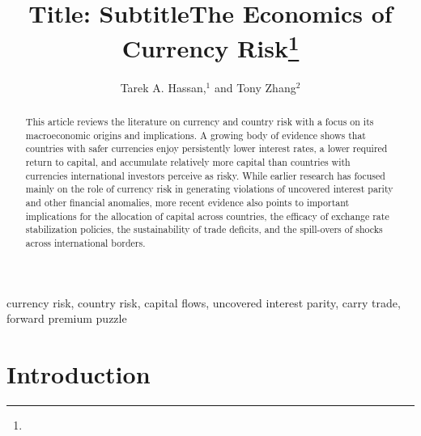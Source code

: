\documentclass{ar-1col}
\begin{document}

\title{Title: Subtitle}


\author{Tarek A. Hassan,$^1$ and Tony Zhang$^2$  }



\title{The Economics of Currency Risk\thanks{}}



\begin{abstract}
  This article reviews the literature on currency and country risk with a focus on its macroeconomic origins and implications. A growing body of evidence shows that countries with safer currencies enjoy persistently lower interest rates, a lower required return to capital, and accumulate relatively more capital than countries with currencies international investors perceive as risky. While earlier research has focused mainly on the role of currency risk in generating violations of uncovered interest parity and other financial anomalies, more recent evidence also points to important implications for the allocation of capital across countries, the efficacy of exchange rate stabilization policies, the sustainability of trade deficits, and the spill-overs of shocks across international borders.
\end{abstract}


\begin{keywords}
  currency risk, country risk, capital flows, uncovered interest parity, carry trade, forward premium puzzle
\end{keywords}
\maketitle


\section{Introduction}
\end{document}
